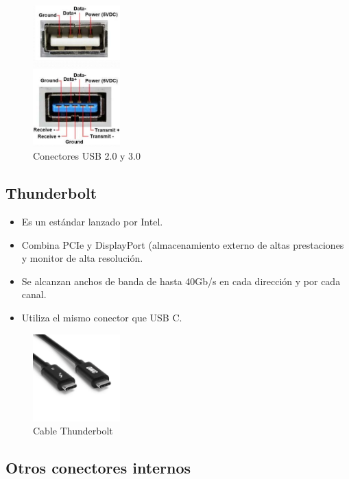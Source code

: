 \documentclass[12pt,spanish]{article}
\begin{document}
\begin{figure}[H]
	\centering
	\includegraphics[width=0.3\textwidth]{usb.png}
	\caption{Conectores USB 2.0 y 3.0}
\end{figure}

\subsection{Thunderbolt}

\begin{itemize}
	\item Es un estándar lanzado por Intel.
	\item Combina PCIe y DisplayPort (almacenamiento externo de altas prestaciones y monitor de alta resolución.
	\item Se alcanzan anchos de banda de hasta 40Gb/s en cada dirección y por cada canal.
	\item Utiliza el mismo conector que USB C.
\end{itemize}

\begin{figure}[H]
	\centering
	\includegraphics[width=0.3\textwidth]{thunderbolt.png}
	\caption{Cable Thunderbolt}
\end{figure}

\subsection{Otros conectores internos}
\end{document}
